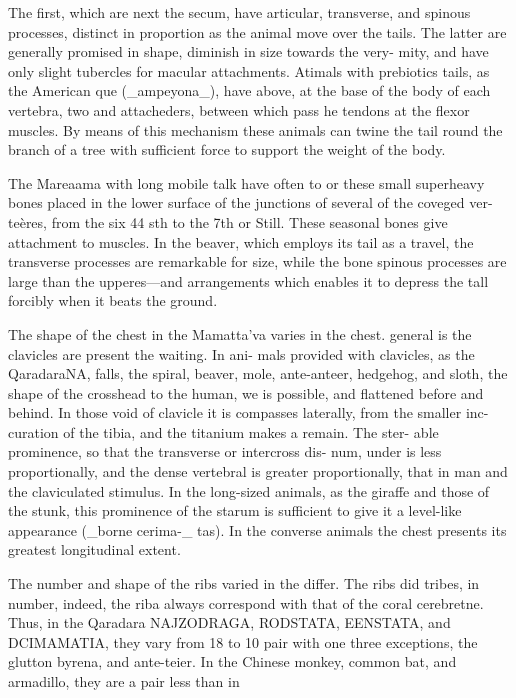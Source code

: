 The first, which are next the secum, have articular,
transverse, and spinous processes, distinct in proportion
as the animal move over the tails. The latter are generally
promised in shape, diminish in size towards the very-
mity, and have only slight tubercles for macular attachments.
Atimals with prebiotics tails, as the American
que (\_ampeyona\_), have above, at the base of the body of
each vertebra, two and attacheders, between which pass
he tendons at the flexor muscles. By means of this
mechanism these animals can twine the tail round the
branch of a tree with sufficient force to support the weight
of the body.\par\medskip
The Mareaama with long mobile talk have often to
or these small superheavy bones placed in the lower
surface of the junctions of several of the coveged ver-
teères, from the six 44 sth to the 7th or Still. These
seasonal bones give attachment to muscles. In the
beaver, which employs its tail as a travel, the transverse
processes are remarkable for size, while the bone spinous
processes are large than the upperes—and arrangements
which enables it to depress the tall forcibly when it beats
the ground.\par\medskip
The shape of the chest in the Mamatta’va varies in the chest.
general is the clavicles are present the waiting. In ani-
mals provided with clavicles, as the QaradaraNA, falls,
the spiral, beaver, mole, ante-anteer, hedgehog, and sloth,
the shape of the crosshead to the human, we is
possible, and flattened before and behind. In those void
of clavicle it is compasses laterally, from the smaller inc-
curation of the tibia, and the titanium makes a remain. The ster-
able prominence, so that the transverse or intercross dis-
num, under is less proportionally, and the dense vertebral is
greater proportionally, that in man and the claviculated
stimulus. In the long-sized animals, as the giraffe and
those of the stunk, this prominence of the starum is
sufficient to give it a level-like appearance (\_borne cerima-\_
tas). In the converse animals the chest presents its greatest longitudinal extent.\par\medskip
The number and shape of the ribs varied in the differ. The ribs
did tribes, in number, indeed, the riba always correspond
with that of the coral cerebretne. Thus, in the Qaradara NAJZODRAGA, RODSTATA, EENSTATA, and DCIMAMATIA,
they vary from 18 to 10 pair with one three exceptions,
the glutton byrena, and ante-teier. In the Chinese monkey,
common bat, and armadillo, they are a pair less than in\par\medskip
